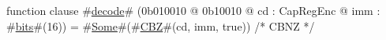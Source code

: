 function clause #\hyperref[sailMIPSzdecode]{decode}# (0b010010 @ 0b10010 @ cd : CapRegEnc @ imm : #\hyperref[sailMIPSzbits]{bits}#(16)) = #\hyperref[sailMIPSzSome]{Some}#(#\hyperref[sailMIPSzCBZ]{CBZ}#(cd, imm, true))  /* CBNZ */
